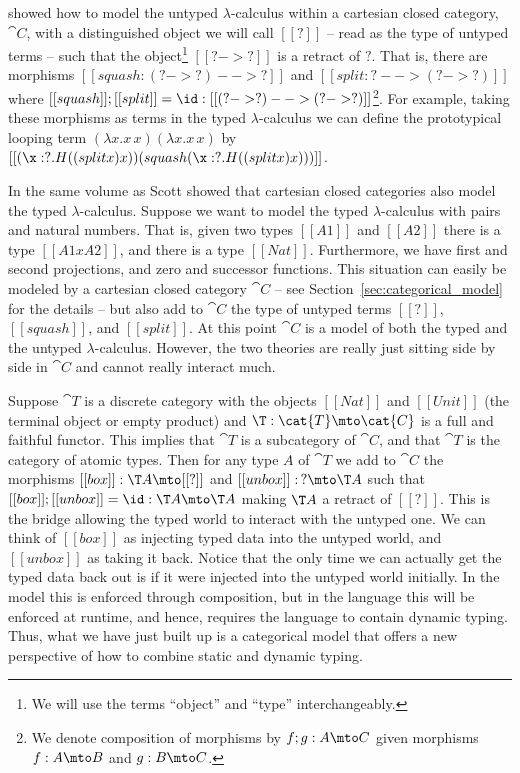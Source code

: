 \cite{Scott:1980} showed how to model the untyped $\lambda$-calculus
within a cartesian closed category, $\cat{C}$, with a distinguished
object we will call $[[?]]$ -- read as the type of untyped terms --
such that the object\footnote{We will use the terms ``object'' and
  ``type'' interchangeably.} $[[? ->?]]$ is a retract of $?$.  That
is, there are morphisms $[[squash : (? -> ?)  --> ?]]$ and $[[split :
    ?  --> (? -> ?)]]$ where $[[squash]];[[split]] = \id : [[(? -> ?)
    --> (? -> ?)]]$\footnote{We denote composition of morphisms by
  $f;g : A \mto C$ given morphisms $f : A \mto B$ and $g : B \mto
  C$.}.  For example, taking these morphisms as terms in the typed
$\lambda$-calculus we can define the prototypical looping term
$(\lambda x.x\,x)(\lambda x.x\,x)$ by
$[[(\x:?.H((split x) x))(squash (\x:?.H((split x) x)))]]$.

In the same volume as Scott \cite{Lambek:1980} showed that cartesian
closed categories also model the typed $\lambda$-calculus. Suppose we
want to model the typed $\lambda$-calculus with pairs and natural
numbers.  That is, given two types $[[A1]]$ and $[[A2]]$ there is a
type $[[A1 x A2]]$, and there is a type $[[Nat]]$.  Furthermore, we
have first and second projections, and zero and successor
functions. This situation can easily be modeled by a cartesian closed
category $\cat{C}$ -- see Section~\ref{sec:categorical_model} for the
details -- but also add to $\cat{C}$ the type of untyped terms
$[[?]]$, $[[squash]]$, and $[[split]]$. At this point $\cat{C}$ is a
model of both the typed and the untyped $\lambda$-calculus.  However,
the two theories are really just sitting side by side in $\cat{C}$ and
cannot really interact much.

Suppose $\cat{T}$ is a discrete category with the objects $[[Nat]]$
and $[[Unit]]$ (the terminal object or empty product) and $\T :
\cat{T} \mto \cat{C}$ is a full and faithful functor.  This implies
that $\cat{T}$ is a subcategory of $\cat{C}$, and that $\cat{T}$ is
the category of atomic types.  Then for any type $A$ of $\cat{T}$ we
add to $\cat{C}$ the morphisms $[[box]] : \T A \mto [[?]]$ and
$[[unbox]] :\, ? \mto \T A$ such that $[[box]];[[unbox]] = \id : \T A
\mto \T A$ making $\T A$ a retract of $[[?]]$.  This is the bridge
allowing the typed world to interact with the untyped one.  We can
think of $[[box]]$ as injecting typed data into the untyped world, and
$[[unbox]]$ as taking it back.  Notice that the only time we can
actually get the typed data back out is if it were injected into the
untyped world initially.  In the model this is enforced through
composition, but in the language this will be enforced at runtime, and
hence, requires the language to contain dynamic typing.  Thus, what we
have just built up is a categorical model that offers a new
perspective of how to combine static and dynamic typing.


